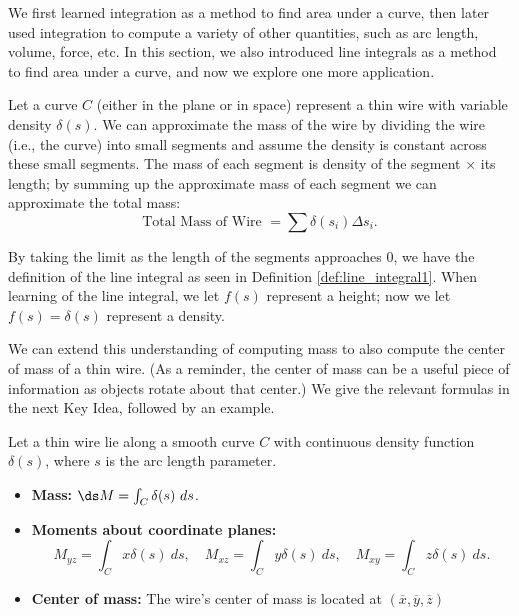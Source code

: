 We first learned integration as a method to find area under a curve, then later used integration to compute a variety of other quantities, such as arc length, volume, force, etc. In this section, we also introduced line integrals as a method to find area under a curve, and now we explore one more application.

Let a curve $C$ (either in the plane or in space) represent a thin wire with variable density $\delta(s)$. We can approximate the mass of the wire by dividing the wire (i.e., the curve) into small segments and assume the density is constant across these small segments. The mass of each segment is density of the segment $\times$ its length; by summing up the approximate mass of each segment we can approximate the total mass:
$$\text{Total Mass of Wire } = \sum \delta(s_i)\Delta s_i.$$

By taking the limit as the length of the segments approaches 0, we have the definition of the line integral as seen in Definition \ref{def:line_integral1}. When learning of the line integral, we let $f(s)$ represent a height; now we let $f(s) = \delta(s)$ represent a density.

We can extend this understanding of computing mass to also compute the center of mass of a thin wire. (As a reminder, the center of mass can be a useful piece of information as objects rotate about that center.) We give the relevant formulas in the next Key Idea, followed by an example.

{Let a thin wire lie along a smooth curve $C$ with continuous density function $\delta(s)$, where $s$ is the arc length parameter. 
\begin{itemize}
	\item \textbf{Mass:} $\ds M = \int_C \delta(s)\ ds$.
	\item	\textbf{Moments about coordinate planes:}
	$$ M_{yz} = \int_C x\delta(s)\ ds, \quad M_{xz} = \int_C y\delta(s)\ ds,\quad M_{xy} = \int_C z\delta(s)\ ds.$$
	\item \textbf{Center of mass:} The wire's center of mass is located at $(\overline{x},\overline{y},\overline{z})$
\end{itemize}
}

